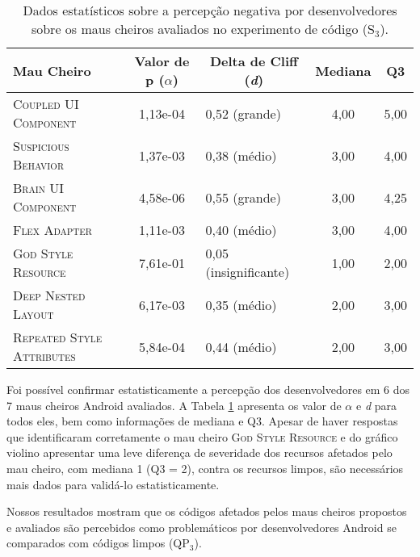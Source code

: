 \begin{table}[!htb]
\centering
\renewcommand*{\arraystretch}{1}
\footnotesize
\caption{Dados estatísticos sobre a percepção negativa por desenvolvedores sobre os maus cheiros avaliados no experimento de código (S$_3$).}
\begin{tabular}{@{}p{7cm}clcc@{}}
\toprule
\textbf{Mau Cheiro} & \multicolumn{1}{c}{\textbf{Valor de p ($\alpha$)}} & \multicolumn{1}{c}{\textbf{Delta de Cliff (\textit{d})}} & \textbf{Mediana} & \textbf{Q3} \\
\toprule
\textsc{\small Coupled UI Component}       &  1,13e-04  &    0,52 (grande) & 4,00         & 5,00 \\
\textsc{\small Suspicious Behavior}          &  1,37e-03  &    0,38 (médio)  & 3,00         & 4,00 \\
\textsc{\small Brain UI Component}        &  4,58e-06  &    0,55 (grande) & 3,00         & 4,25 \\
\textsc{\small Flex Adapter}                &  1,11e-03  &    0,40 (médio)  & 3,00         & 4,00 \\
\textsc{\small God Style Resource}         &  7,61e-01  &    0,05 (insignificante) & 1,00 & 2,00 \\
\textsc{\small Deep Nested Layout}   &  6,17e-03  &    0,35 (médio)  & 2,00         & 3,00 \\
\textsc{\small Repeated Style Attributes}   &  5,84e-04  &    0,44 (médio)  & 2,00         & 3,00 \\
\bottomrule
\end{tabular}
\label{tab:smells-avaliados}
\end{table}


Foi possível confirmar estatisticamente a percepção dos desenvolvedores em 6 dos 7 maus cheiros Android avaliados. A Tabela \ref{tab:smells-avaliados} apresenta os valor de $\alpha$ e \textit{d} para todos eles, bem como informações de mediana e Q3. Apesar de haver respostas que identificaram corretamente o mau cheiro \textsc{\small God Style Resource} e do gráfico violino apresentar uma leve diferença de severidade dos recursos afetados pelo mau cheiro, com mediana 1 (Q3 = 2), contra os recursos limpos, são necessários mais dados para validá-lo estatisticamente. \\

\begin{square}
  \small
  Nossos resultados mostram que os códigos afetados pelos maus cheiros propostos e avaliados são percebidos como problemáticos por desenvolvedores Android se comparados com códigos limpos (QP$_3$).
\end{square}

